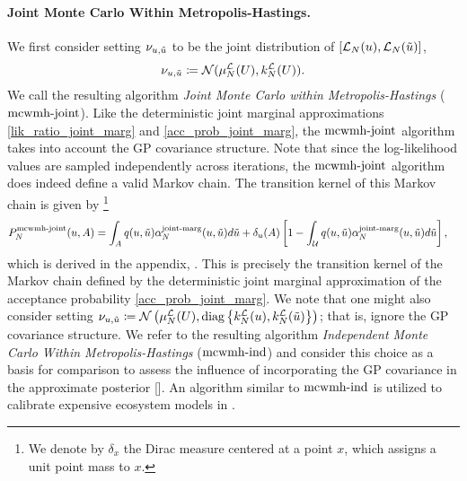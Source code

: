 \documentclass[12pt]{article}
\begin{document}
\paragraph{Joint Monte Carlo Within Metropolis-Hastings.}
We first consider setting $\llikSampDist_{\Par, \propPar}$ to be the joint distribution of 
$[\llikEm[\Ndesign](\Par), \llikEm[\Ndesign](\propPar)]$, 
\begin{align}
\llikSampDist_{\Par, \propPar} \Def \Gaussian(\emMean[\Ndesign]{\llik}(\parMat), \emKer[\Ndesign]{\llik}(\parMat)).
\label{llik_dist_MCWMH-joint}
\end{align}
We call the resulting algorithm \textit{Joint Monte Carlo within Metropolis-Hastings} ($\mcwmhJointLabel$). 
Like the deterministic joint marginal approximations \ref{lik_ratio_joint_marg} and \ref{acc_prob_joint_marg}, 
the $\mcwmhJointLabel$ algorithm takes into account the GP covariance structure. Note that since the log-likelihood
values are sampled independently across iterations, the $\mcwmhJointLabel$ algorithm does indeed define a valid 
Markov chain. The transition kernel of this Markov chain is given by 
\footnote{We denote by $\delta_{x}$ the Dirac measure centered at a point $x$, which assigns a unit point mass to $x$.}
\begin{align}
\llikEmJointMCWMH[\Ndesign]{\MarkovKernel}(\Par, A) 
&= \int_{A} \propDens(\Par, \propPar) \llikEmJointMarg[\Ndesign]{\accProbMH}(\Par, \propPar) d\propPar 
+ \delta_{\Par}(A) \left[1 - \int_{\parSpace} \propDens(\Par, \propPar) \llikEmJointMarg[\Ndesign]{\accProbMH}(\Par, \propPar) d\propPar \right],
\label{MCWMH-joint-kernel}
\end{align}
which is derived in the appendix, . This is precisely the transition kernel of the Markov chain 
defined by the deterministic joint marginal approximation of the acceptance probability \ref{acc_prob_joint_marg}. We note that 
one might also consider setting 
$\llikSampDist_{\Par, \propPar} 
\Def \Gaussian\left(\emMean[\Ndesign]{\llik}(\parMat), \diag\left\{\emKer[\Ndesign]{\llik}(\Par), \emKer[\Ndesign]{\llik}(\propPar) \right\}\right)$; 
that is, ignore the GP covariance structure. We refer to the resulting algorithm
\textit{Independent Monte Carlo Within Metropolis-Hastings} ($\mcwmhIndLabel$) and consider this choice as a basis for 
comparison to assess the influence of incorporating the GP covariance in the approximate posterior [\todo]. 
An algorithm similar to $\mcwmhIndLabel$ is utilized to calibrate expensive ecosystem models 
in \cite{FerEmulation}. 
\end{document}
